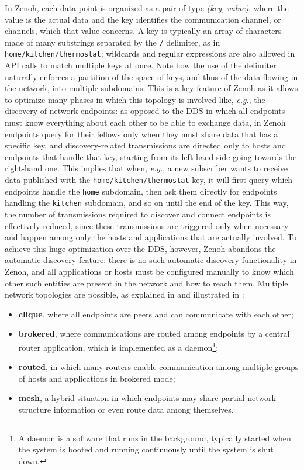 In Zenoh, each data point is organized as a pair of type \emph{(key, value)}, where the value is the actual data and the key identifies the communication channel, or channels, which that value concerns. A key is typically an array of characters made of many substrings separated by the \texttt{/} delimiter, as in \texttt{home/kitchen/thermostat}; wildcards and regular expressions are also allowed in API calls to match multiple keys at once. Note how the use of the delimiter naturally enforces a partition of the space of keys, and thus of the data flowing in the network, into multiple subdomains. This is a key feature of Zenoh as it allows to optimize many phases in which this topology is involved like, \emph{e.g.}, the discovery of network endpoints: as opposed to the DDS in which all endpoints must know everything about each other to be able to exchange data, in Zenoh endpoints query for their fellows only when they must share data that has a specific key, and discovery-related transmissions are directed only to hosts and endpoints that handle that key, starting from its left-hand side going towards the right-hand one. This implies that when, \emph{e.g.}, a new subscriber wants to receive data published with the \texttt{home/kitchen/thermostat} key, it will first query which endpoints handle the \texttt{home} subdomain, then ask them directly for endpoints handling the \texttt{kitchen} subdomain, and so on until the end of the key. This way, the number of transmissions required to discover and connect endpoints is effectively reduced, since these transmissions are triggered only when necessary and happen among only the hosts and applications that are actually involved. To achieve this huge optimization over the DDS, however, Zenoh abandons the automatic discovery feature: there is no such automatic discovery functionality in Zenoh, and all applications or hosts must be configured manually to know which other such entities are present in the network and how to reach them. Multiple network topologies are possible, as explained in \cite{corsaro_zenoh_2023} and illustrated in :
\begin{itemize}
  \item \textbf{clique}, where all endpoints are peers and can communicate with each other;
  \item \textbf{brokered}, where communications are routed among endpoints by a central router application, which is implemented as a daemon\footnote{A daemon is a software that runs in the background, typically started when the system is booted and running continuously until the system is shut down.};
  \item \textbf{routed}, in which many routers enable communication among multiple groups of hosts and applications in brokered mode;
  \item \textbf{mesh}, a hybrid situation in which endpoints may share partial network structure information or even route data among themselves.
\end{itemize}
